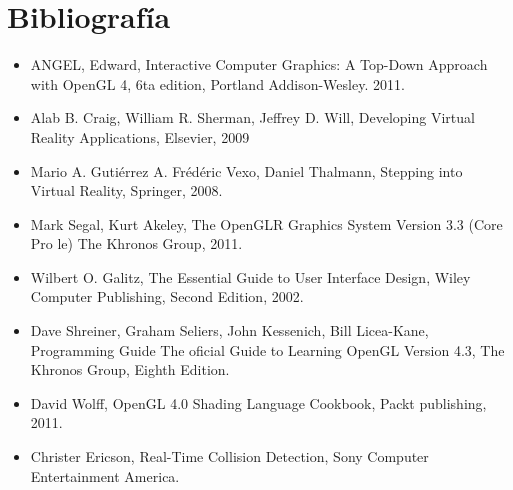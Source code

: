 \documentclass[a4paper,11pt]{article}
\theoremstyle{mytheor}
\begin{document}
\section*{Bibliografía}

\begin{itemize}
	\item ANGEL, Edward, Interactive Computer Graphics: A Top-Down Approach
with OpenGL 4, 6ta edition, Portland
Addison-Wesley. 2011.
	\item Alab B. Craig, William R. Sherman, Jeffrey D. Will, Developing Virtual
Reality Applications, Elsevier, 2009
	\item Mario A. Gutiérrez A. Frédéric Vexo, Daniel Thalmann, Stepping into Virtual
Reality, Springer, 2008.
	\item Mark Segal, Kurt Akeley, The OpenGLR Graphics System Version 3.3 (Core
Pro le) The Khronos Group, 2011.
	\item Wilbert O. Galitz, The Essential Guide to User Interface Design, Wiley
Computer Publishing, Second Edition, 2002.
	\item Dave Shreiner, Graham Seliers, John Kessenich, Bill Licea-Kane,
Programming Guide The oficial Guide to Learning
OpenGL Version
4.3, The Khronos Group, Eighth Edition.
	\item David Wolff, OpenGL 4.0 Shading Language Cookbook, Packt publishing,
2011.
	\item Christer Ericson, Real-Time Collision Detection, Sony Computer
Entertainment America.
\end{itemize}
\end{document}
